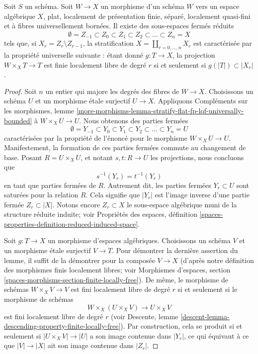 \begin{lemma}
\label{lemma-quasi-compact-reasonable-stratification}
Soit $S$ un schéma. Soit $W \to X$ un morphisme d'un schéma $W$
vers un espace algébrique $X$, plat, localement de présentation finie,
séparé, localement quasi-fini et à fibres universellement bornées. Il existe
des sous-espaces fermés réduits
$$
\emptyset = Z_{-1} \subset Z_0 \subset Z_1 \subset Z_2 \subset
\ldots \subset Z_n = X
$$
tels que, si $X_r = Z_r \setminus Z_{r - 1}$, la stratification
$X = \coprod_{r = 0, \ldots, n} X_r$ est caractérisée par la propriété
universelle suivante : étant donné $g : T \to X$, la projection
$W \times_X T \to T$ est finie localement libre de degré $r$ si et seulement si
$g(|T|) \subset |X_r|$.
\end{lemma}

\begin{proof}
Soit $n$ un entier qui majore les degrés des fibres de $W \to X$.
Choisissons un schéma $U$ et un morphisme étale surjectif $U \to X$.
Appliquons Compléments sur les morphismes, lemme
\ref{more-morphisms-lemma-stratify-flat-fp-lqf-universally-bounded}
à $W \times_X U \to U$. Nous obtenons des parties fermées
$$
\emptyset = Y_{-1} \subset Y_0 \subset Y_1 \subset Y_2 \subset
\ldots \subset Y_n = U
$$
caractérisées par la propriété de l'énoncé pour le morphisme
$W \times_X U \to U$. Manifestement, la formation de ces parties fermées
commute au changement de base. Posant $R = U \times_X U$, et notant
$s, t : R \to U$ les projections, nous concluons que
$$
s^{-1}(Y_r) = t^{-1}(Y_r)
$$
en tant que parties fermées de $R$. Autrement dit, les parties fermées
$Y_r \subset U$ sont saturées pour la relation $R$. Cela signifie que
$|Y_r|$ est l'image inverse d'une partie fermée $Z_r \subset |X|$.
Notons encore $Z_r \subset X$ le sous-espace algébrique muni de la structure
réduite induite; voir Propriétés des espaces, définition
\ref{spaces-properties-definition-reduced-induced-space}.

\medskip\noindent
Soit $g : T \to X$ un morphisme d'espaces algébriques. Choisissons un schéma
$V$ et un morphisme étale surjectif $V \to T$. Pour démontrer la dernière
assertion du lemme, il suffit de la démontrer pour la composée
$V \to X$ (d'après notre définition des morphismes finis localement libres;
voir Morphismes d'espaces, section
\ref{spaces-morphisms-section-finite-locally-free}).
De même, le morphisme de schémas $W \times_X V \to V$ est fini
localement libre de degré $r$ si et seulement si le morphisme de schémas
$$
W \times_X (U \times_X V)
\longrightarrow
U \times_X V
$$
est fini localement libre de degré $r$ (voir
Descente, lemme \ref{descent-lemma-descending-property-finite-locally-free}).
Par construction, cela se produit si et seulement si
$|U \times_X V| \to |U|$ a son image contenue dans $|Y_r|$, ce qui équivaut
à ce que $|V| \to |X|$ ait son image contenue dans $|Z_r|$.
\end{proof}

